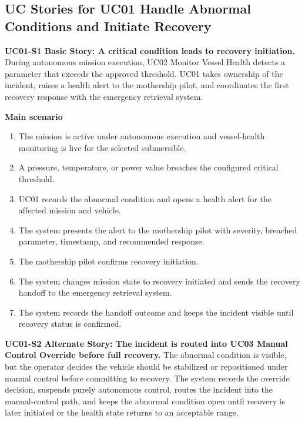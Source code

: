 \documentclass[10pt,a4paper]{article}
\begin{document}
\subsection*{UC Stories for UC01 Handle Abnormal Conditions and Initiate Recovery}
{}
\label{sec:uc01-stories}

\textbf{UC01-S1 Basic Story: A critical condition leads to recovery initiation.} During autonomous mission execution, UC02 Monitor Vessel Health detects a parameter that exceeds the approved threshold. UC01 takes ownership of the incident, raises a health alert to the mothership pilot, and coordinates the first recovery response with the emergency retrieval system.

\textbf{Main scenario}
\begin{enumerate}[leftmargin=*,nosep]
  \item The mission is active under autonomous execution and vessel-health monitoring is live for the selected submersible.
  \item A pressure, temperature, or power value breaches the configured critical threshold.
  \item UC01 records the abnormal condition and opens a health alert for the affected mission and vehicle.
  \item The system presents the alert to the mothership pilot with severity, breached parameter, timestamp, and recommended response.
  \item The mothership pilot confirms recovery initiation.
  \item The system changes mission state to recovery initiated and sends the recovery handoff to the emergency retrieval system.
  \item The system records the handoff outcome and keeps the incident visible until recovery status is confirmed.
\end{enumerate}

\textbf{UC01-S2 Alternate Story: The incident is routed into UC03 Manual Control Override before full recovery.} The abnormal condition is visible, but the operator decides the vehicle should be stabilized or repositioned under manual control before committing to recovery. The system records the override decision, suspends purely autonomous control, routes the incident into the manual-control path, and keeps the abnormal condition open until recovery is later initiated or the health state returns to an acceptable range.
\end{document}
